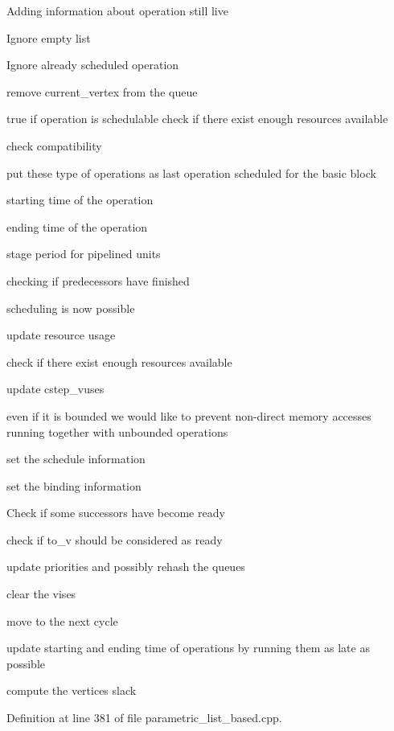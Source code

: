 Adding information about operation still live

Ignore empty list

Ignore already scheduled operation

remove current\+\_\+vertex from the queue

true if operation is schedulable check if there exist enough resources available

check compatibility

put these type of operations as last operation scheduled for the basic block

starting time of the operation

ending time of the operation

stage period for pipelined units

checking if predecessors have finished

scheduling is now possible

update resource usage

check if there exist enough resources available

update cstep\+\_\+vuses

even if it is bounded we would like to prevent non-\/direct memory accesses running together with unbounded operations

set the schedule information

set the binding information

Check if some successors have become ready

check if to\+\_\+v should be considered as ready

update priorities and possibly rehash the queues

clear the vises

move to the next cycle

update starting and ending time of operations by running them as late as possible

compute the vertices slack 

Definition at line 381 of file parametric\+\_\+list\+\_\+based.\+cpp.



